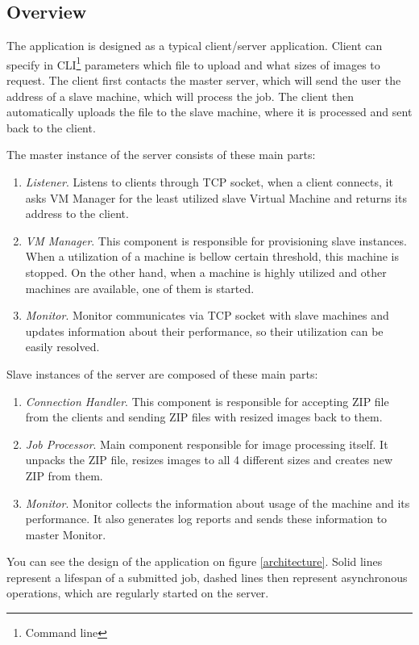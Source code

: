 \subsection{Overview}
The application is designed as a typical client/server application. Client can specify in CLI\footnote{Command line} parameters which file to upload and what sizes of images to request. The client first contacts the master server, which will send the user the address of a slave machine, which will process the job. The client then automatically uploads the file to the slave machine, where it is processed and sent back to the client.

The master instance of the server consists of these main parts:

\begin{enumerate}
 \item \emph{Listener}. Listens to clients through TCP socket, when a client connects, it asks VM Manager for the least utilized slave Virtual Machine and returns its address to the client.
 \item \emph{VM Manager}. This component is responsible for provisioning slave instances. When a utilization of a machine is bellow certain threshold, this machine is stopped. On the other hand, when a machine is highly utilized and other machines are available, one of them is started.
 \item \emph{Monitor}. Monitor communicates via TCP socket with slave machines and updates information about their performance, so their utilization can be easily resolved.
\end{enumerate}

Slave instances of the server are composed of these main parts:

\begin{enumerate}
 \item \emph{Connection Handler}. This component is responsible for accepting ZIP file from the clients and sending ZIP files with resized images back to them.
 \item \emph{Job Processor}. Main component responsible for image processing itself. It unpacks the ZIP file, resizes images to all 4 different sizes and creates new ZIP from them.
 \item \emph{Monitor}. Monitor collects the information about usage of the machine and its performance. It also generates log reports and sends these information to master Monitor.
\end{enumerate}

You can see the design of the application on figure \ref{architecture}. Solid lines represent a lifespan of a submitted job, dashed lines then represent asynchronous operations, which are regularly started on the server. 

